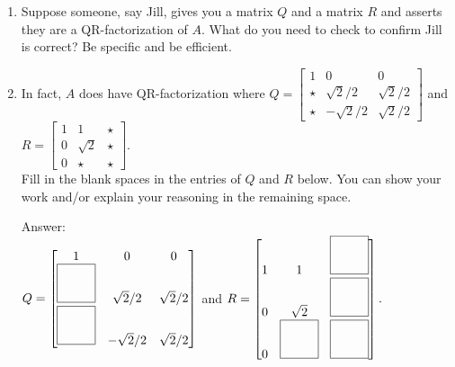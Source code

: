 \documentclass[11pt,fleqn]{article}
\begin{document}
\begin{enumerate}
\begin{enumerate}
	\item Suppose someone, say Jill, gives you a matrix $Q$ and a matrix $R$ and asserts they are a QR-factorization of $A$. What do you need to check to confirm Jill is correct? Be specific and be efficient.
	\vfill
	\item In fact, $A$ does have QR-factorization where $Q=\begin{bmatrix} 1&0&0\\ \star& \sqrt{2}/2&\sqrt{2}/2\\ \star& -\sqrt{2}/2&\sqrt{2}/2\end{bmatrix}$ and $R=\begin{bmatrix} 1&1&\star \\ 0& \sqrt{2}&\star \\ 0& \star&\star \end{bmatrix}.$\\
	
	Fill in the blank spaces in the entries of $Q$ and $R$ below. You can show your work and/or explain your reasoning in the remaining space.
	
	
	Answer: \\
	
	$Q=\begin{bmatrix} 1&0&0\\ \framebox(30,30){}& \sqrt{2}/2&\sqrt{2}/2\\ \framebox(30,30){}& -\sqrt{2}/2&\sqrt{2}/2\end{bmatrix}$ and $R=\begin{bmatrix} 1&1&\framebox(30,30){} \\ 0& \sqrt{2}&\framebox(30,30){} \\ 0& \framebox(30,30){}&\framebox(30,30){} \end{bmatrix}.$\\
	

\end{enumerate}
\end{enumerate}
\end{document}
